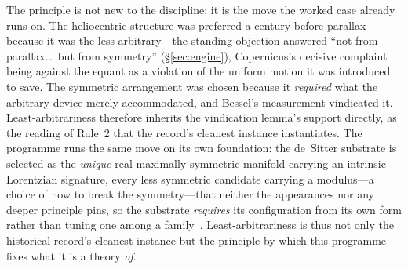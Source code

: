 \documentclass[11pt,a4paper]{article}
\begin{document}
The principle is not new to the discipline; it is the move the worked case already runs on. The heliocentric structure was preferred a century before parallax because it was the less arbitrary---the standing objection answered ``not from parallax\ldots\ but from symmetry'' (\S\ref{sec:engine}), Copernicus's decisive complaint being against the equant as a violation of the uniform motion it was introduced to save. The symmetric arrangement was chosen because it \emph{required} what the arbitrary device merely accommodated, and Bessel's measurement vindicated it. Least-arbitrariness therefore inherits the vindication lemma's support directly, as the reading of Rule~2 that the record's cleanest instance instantiates. The programme runs the same move on its own foundation: the de~Sitter substrate is selected as the \emph{unique} real maximally symmetric manifold carrying an intrinsic Lorentzian signature, every less symmetric candidate carrying a modulus---a choice of how to break the symmetry---that neither the appearances nor any deeper principle pins, so the substrate \emph{requires} its configuration from its own form rather than tuning one among a family~\cite{JanzenSlicing,JanzenGeometricCore}. Least-arbitrariness is thus not only the historical record's cleanest instance but the principle by which this programme fixes what it is a theory \emph{of}.
\end{document}
